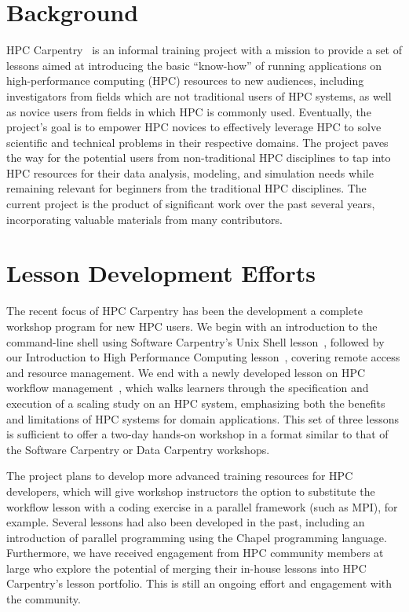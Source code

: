 \section{Background}

HPC Carpentry~\cite{HPCC-website} is an informal training project with a mission to provide a set of lessons aimed at introducing the basic ``know-how'' of running applications on high-performance computing (HPC) resources to new audiences, including investigators from fields which are not traditional users of HPC systems, as well as novice users from fields in which HPC is commonly used.
Eventually, the project's goal is to empower HPC novices to effectively leverage HPC to solve scientific and technical problems in their respective domains.
The project paves the way for the potential users from non-traditional HPC disciplines to tap into HPC resources for their data analysis, modeling, and simulation needs while remaining relevant for beginners from the traditional HPC disciplines.
The current project is the product of significant work over the past several years, incorporating valuable materials from many contributors.



\section{Lesson Development Efforts}

The recent focus of HPC Carpentry has been the development a complete workshop program for new HPC users.
We begin with an introduction to the command-line shell using Software Carpentry's Unix Shell lesson~\cite{SwC-UNIX-Shell_v3},
followed by our Introduction to High Performance Computing lesson~\cite{HPCC_hpc-intro}, covering remote access and resource management.
We end with a newly developed lesson on HPC workflow management~\cite{HPCC_hpc-workflows}, which walks learners through the specification and execution of a scaling study on an HPC system, emphasizing both the benefits and limitations of HPC systems for domain applications. 
This set of three lessons is sufficient to offer a two-day hands-on workshop in a format similar to that of the Software Carpentry or Data Carpentry workshops.

The project plans to develop more advanced training resources for HPC developers, which will give workshop instructors the option to substitute the workflow lesson with a coding exercise in a parallel framework (such as MPI), for example.
Several lessons had also been developed in the past, including an introduction of parallel programming using the Chapel programming language.
Furthermore, we have received engagement from HPC community members at large who explore the potential of merging their in-house lessons into HPC Carpentry's lesson portfolio.
This is still an ongoing effort and engagement with the community.



